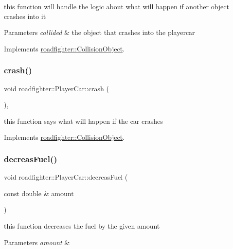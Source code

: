 this function will handle the logic about what will happen if another object crashes into it 
\begin{DoxyParams}{Parameters}
{\em collided} & the object that crashes into the playercar \\
\hline
\end{DoxyParams}


Implements \hyperlink{classroadfighter_1_1CollisionObject_a7eafa2fdc4463788b816fdd9370d28d9}{roadfighter\+::\+Collision\+Object}.

\mbox{\label{classroadfighter_1_1PlayerCar_a330d071af729d7afbfcfd7ef92516544}} 
\subsubsection{\texorpdfstring{crash()}{crash()}}
{\footnotesize\ttfamily void roadfighter\+::\+Player\+Car\+::crash (\begin{DoxyParamCaption}{ }\end{DoxyParamCaption})\hspace{0.3cm}{\ttfamily [override]}, {\ttfamily [virtual]}}

this function says what will happen if the car crashes 

Implements \hyperlink{classroadfighter_1_1CollisionObject_a18f0f60a5a664d6fb554daac0d398a2c}{roadfighter\+::\+Collision\+Object}.

\mbox{\label{classroadfighter_1_1PlayerCar_a3e0ac4c28d1635e5d142c81beeec05dc}} 
\subsubsection{\texorpdfstring{decreas\+Fuel()}{decreasFuel()}}
{\footnotesize\ttfamily void roadfighter\+::\+Player\+Car\+::decreas\+Fuel (\begin{DoxyParamCaption}\item[{const double \&}]{amount }\end{DoxyParamCaption})}

this function decreases the fuel by the given amount 
\begin{DoxyParams}{Parameters}
{\em amount} & \\
\hline
\end{DoxyParams}
\mbox{\label{classroadfighter_1_1PlayerCar_aefc7f96fae66baecef10861a6b1fa0f2}} 
